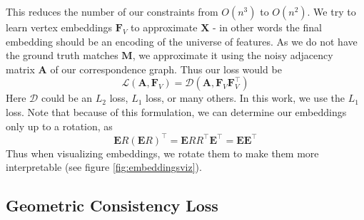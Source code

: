 \documentclass[10pt,twocolumn,letterpaper]{article}
\newcommand{\mat}[1]{\mathbf{#1}}
\begin{document}
This reduces the number of our constraints from $O(n^3)$ to $O(n^2)$.
We try to learn vertex embeddings $\mat{F}_V$ to approximate $\mat{X}$ - in other words the final embedding should be an encoding of the universe of features.
As we do not have the ground truth matches $\mat{M}$, we approximate it using the noisy adjacency matrix $\mat{A}$ of our correspondence graph. Thus our loss would be 
\begin{equation}
\mathcal{L}(\mat{A}, \mat{F}_V) = \mathcal{D}(\mat{A}, \mat{F}_V \mat{F}_V^\top)
\end{equation}
Here $\mathcal{D}$ could be an $L_2$ loss, $L_1$ loss, or many others. In this work, we use the $L_1$ loss. 
Note that because of this formulation, we can determine our embeddings only up to a rotation, as
\begin{equation}
\mat{E}R(\mat{E}R)^\top
= \mat{E}RR^\top\mat{E}^\top
= \mat{E}\mat{E}^\top
\label{eq:rotinvar}
\end{equation}
Thus when visualizing embeddings, we rotate them to make them more interpretable (see figure \ref{fig:embeddingsviz}).

\subsection{Geometric Consistency Loss}
\end{document}
